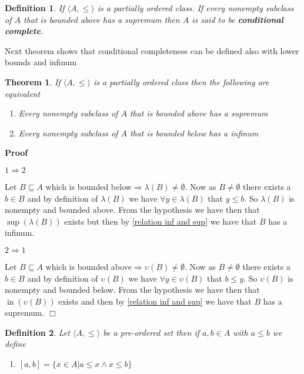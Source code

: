 \documentclass{book}
\newcommand{\tmop}[1]{\ensuremath{\operatorname{#1}}}
\newcommand{\tmtextbf}[1]{{\bfseries{#1}}}
\newenvironment{proof}{\noindent\textbf{Proof\ }}{\hspace*{\fill}$\Box$\medskip}
\newtheorem{definition}{Definition}
{\theorembodyfont{\rmfamily}\newtheorem{example}{Example}}
\newtheorem{theorem}{Theorem}
\begin{document}
{{\begin{definition}
  \label{conditonal complete classes}{}If
  $\langle A, \leqslant \rangle$ is a partially ordered class. If every
  nonempty subclass of $A$ that is bounded above has a supremum then $A$ is
  said to be \tmtextbf{conditional complete}.
\end{definition}

Next theorem shows that conditional completeness can be defined also with
lower bounds and infinum

\begin{theorem}
  \label{alternative definition for conditional completeness}If $\langle A,
  \leqslant \rangle$ is a partially ordered class then the following are
  equivalent
  \begin{enumerate}
    \item Every nonempty subclass of $A$ that is bounded above has a supremum
    
    \item Every nonempty subclass of $A$ that is bounded below has a infinum
  \end{enumerate}
\end{theorem}

\begin{proof}
  
  
  $1 \Rightarrow 2$
  
  Let $B \subseteq A$ which is bounded below$\Rightarrow \lambda (B) \neq
  \emptyset$. Now as $B \neq \emptyset$ there exists a $b \in B$ and by
  definition of $\lambda (B)$ we have $\forall y \in \lambda (B)$ that $y
  \leqslant b$. So $\lambda (B)$ is nonempty and bounded above. From the
  hypothesis we have then that $\sup (\lambda (B))$ exists but then by
  \ref{relation inf and sup} we have that $B$ has a infinum.
  
  $2 \Rightarrow 1$
  
  Let $B \subseteq A$ which is bounded above$\Rightarrow \upsilon (B) \neq
  \emptyset$. Now as $B \neq \emptyset$ there exists a $b \in B$ and by
  definition of $\upsilon (B)$ we have $\forall y \in \upsilon (B)$ that $b
  \leqslant y$. So $\upsilon (B)$ is nonempty and bounded below. From the
  hypothesis we have then that $\tmop{in} (\upsilon (B))$ exists and then by
  \ref{relation inf and sup} we have that $B$ has a supremum.
\end{proof}

\begin{definition}
  \label{generalized interval}{}Let $\langle A,
  \leqslant \rangle$ be a pre-ordered set then if $a, b \in A$ with $a
  \leqslant b$ we define
  \begin{enumerate}
    \item $[a, b] = \{ x \in A|a \leqslant x \wedge x \leqslant b \}$
    

\end{enumerate}
\end{definition}}}
\end{document}
